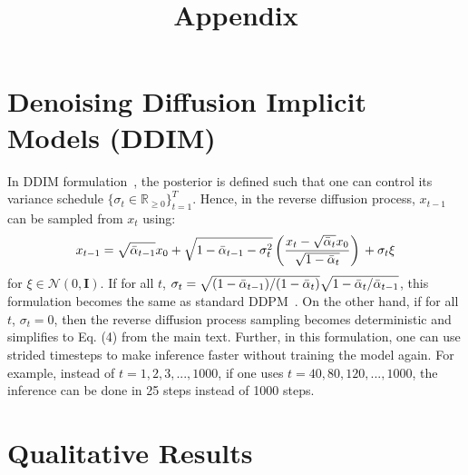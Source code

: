 














\iccvfinalcopy 

\ificcvfinal\pagestyle{empty}\fi

\title{
\Large
\noindent\textbf{Appendix}
}









\section{Denoising Diffusion Implicit Models (DDIM)}
In DDIM formulation~\cite{ddim}, the posterior is defined such that one can control its variance schedule $\{\sigma_t\in \mathbb{R}_{\geq0}\}^T_{t=1}$. Hence, in the reverse diffusion process, $x_{t-1}$ can be sampled from $x_t$ using:
 \begin{equation}
\label{eq:ddim}
x_{t-1}=\sqrt{\Bar{\alpha}_{t-1}}x_0 + \sqrt{1-\Bar{\alpha}_{t-1} - \sigma_t^2}\left(\frac{x_t-\sqrt{\Bar{\alpha}_{t}}x_0}{\sqrt{1-\Bar{\alpha}_{t}}} \right) \\
+ \sigma_t\xi
\end{equation}
for $\xi\in \mathcal{N}(0, \textbf{I})$. If for all $t$, $\sigma_t=\sqrt{(1-\Bar{\alpha}_{t-1})/(1-\Bar{\alpha}_{t})}\sqrt{1-\Bar{\alpha}_{t}/\Bar{\alpha}_{t-1}}$, this formulation becomes the same as standard DDPM~\cite{ddpm}. On the other hand, if for all $t$, $\sigma_t=0$, then the reverse diffusion process sampling becomes deterministic and simplifies to Eq. (4) from the main text. Further, in this formulation, one can use strided timesteps to make inference faster without training the model again. For example, instead of $t=1,2,3,...,1000$, if one uses $t=40, 80, 120, ... , 1000$, the inference can be done in 25 steps instead of 1000 steps.  

\section{Qualitative Results}
